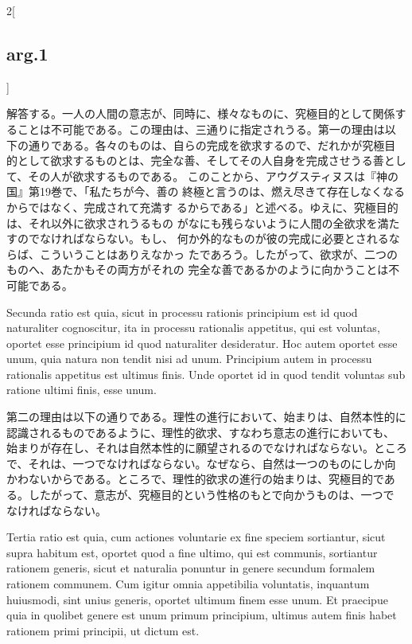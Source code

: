 \documentclass[paper=a4paper,fontsize=10pt,jafontsize=9pt,titlepage]{jlreq}
\begin{document}
\begin{paracol}{2}[\subsection{arg.1}]
\switchcolumn

解答する。一人の人間の意志が、同時に、様々なものに、究極目的として関係す
 ることは不可能である。この理由は、三通りに指定されうる。第一の理由は以
 下の通りである。各々のものは、自らの完成を欲求するので、だれかが究極目
 的として欲求するものとは、完全な善、そしてその人自身を完成させうる善とし
 て、その人が欲求するものである。
 このことから、アウグスティヌスは『神の国』第19巻で、「私たちが今、善の
 終極と言うのは、燃え尽きて存在しなくなるからではなく、完成されて充満す
 るからである」と述べる。ゆえに、究極目的は、それ以外に欲求されうるもの
 がなにも残らないように人間の全欲求を満たすのでなければならない。もし、
 何か外的なものが彼の完成に必要とされるならば、こういうことはありえなかっ
 たであろう。したがって、欲求が、二つのものへ、あたかもその両方がそれの
 完全な善であるかのように向かうことは不可能である。

\switchcolumn*

Secunda ratio est quia, sicut in processu rationis
principium est id quod naturaliter cognoscitur, ita in processu
rationalis appetitus, qui est voluntas, oportet esse principium id quod
naturaliter desideratur. Hoc autem oportet esse unum, quia natura non
tendit nisi ad unum. Principium autem in processu rationalis appetitus
est ultimus finis. Unde oportet id in quod tendit voluntas sub ratione
ultimi finis, esse unum.

\switchcolumn

第二の理由は以下の通りである。理性の進行において、始まりは、自然本性的に
 認識されるものであるように、理性的欲求、すなわち意志の進行においても、
始まりが存在し、それは自然本性的に願望されるのでなければならない。ところ
 で、それは、一つでなければならない。なぜなら、自然は一つのものにしか向
 かわないからである。ところで、理性的欲求の進行の始まりは、究極目的であ
 る。したがって、意志が、究極目的という性格のもとで向かうものは、一つで
 なければならない。

\switchcolumn*

Tertia ratio est quia, cum actiones voluntarie
ex fine speciem sortiantur, sicut supra habitum est, oportet quod a fine
ultimo, qui est communis, sortiantur rationem generis, sicut et
naturalia ponuntur in genere secundum formalem rationem communem. Cum
igitur omnia appetibilia voluntatis, inquantum huiusmodi, sint unius
generis, oportet ultimum finem esse unum. Et praecipue quia in quolibet
genere est unum primum principium, ultimus autem finis habet rationem
primi principii, ut dictum est.

\switchcolumn


\end{paracol}
\end{document}

